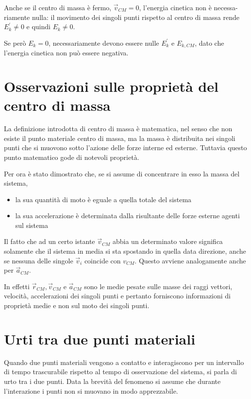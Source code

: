 \documentclass[class=book, crop=false, oneside, 12pt]{standalone}
\begin{document}
Anche se il centro di massa è fermo, \(\overrightarrow{v}_{CM} = 0\), l'energia cinetica non è necessa-riamente nulla: il movimento dei singoli punti rispetto al centro di massa rende \(E_k^{\prime} \neq 0\) e quindi \(E_k \neq 0\).

Se però \(E_k = 0\), necessariamente devono essere nulle \(E_k^{\prime}\) e \(E_{k, CM}\), dato che l'energia cinetica non può essere negativa. 

\section{Osservazioni sulle proprietà del centro di massa}

La definizione introdotta di centro di massa è matematica, nel senso che non esiste il punto materiale centro di massa, ma la massa è distribuita nei singoli punti che si muovono sotto l'azione delle forze interne ed esterne. 
Tuttavia questo punto matematico gode di notevoli proprietà.

Per ora è stato dimostrato che, se si assume di concentrare in esso la massa del sistema, 
\begin{itemize}
    \item la sua quantità di moto è eguale a quella totale del sistema
    \item la sua accelerazione è determinata dalla risultante delle forze esterne agenti sul sistema
\end{itemize}

Il fatto che ad un certo istante \(\overrightarrow{v}_{CM}\) abbia un determinato valore significa solamente che il sistema in media si sta spostando in quella data direzione, anche se nessuna delle singole \(\overrightarrow{v}_i\) coincide con \(v_{CM}\).
Questo avviene analogamente anche per \(\overrightarrow{a}_{CM}\).

In effetti \(\overrightarrow{r}_{CM}, \overrightarrow{v}_{CM}\) e \(\overrightarrow{a}_{CM}\) sono le medie pesate sulle masse dei raggi vettori, velocità, accelerazioni dei singoli punti e pertanto forniscono informazioni di proprietà medie e non sul moto dei singoli punti. 

\section{Urti tra due punti materiali}

Quando due punti materiali vengono a contatto e interagiscono per un intervallo di tempo trascurabile rispetto al tempo di osservazione del sistema, si parla di urto tra i due punti.
Data la brevità del fenomeno si assume che durante l'interazione i punti non si muovano in modo apprezzabile.
\end{document}
